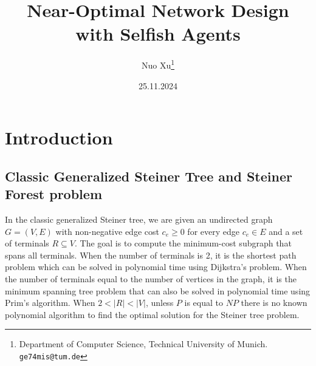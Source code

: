 \documentclass[11pt,psfig,times]{article}
\begin{document}
\title{Near-Optimal Network Design with Selfish Agents}
\author{Nuo Xu\thanks {Department of Computer Science, Technical University of Munich. {\tt ge74mis@tum.de}}}
\date{25.11.2024}
\maketitle

\section{Introduction}

\subsection{Classic Generalized Steiner Tree and Steiner Forest problem}
In the classic generalized Steiner tree, we are given an undirected graph \(G = (V,E)\) with non-negative edge cost \(c_e \geq 0\) for every edge $c_e \in E$ and a set of terminals $R \subseteq V $. The goal is to compute the minimum-cost subgraph that spans all terminals. When the number of terminals is 2, it is the shortest path problem which can be solved in polynomial time using Dijkstra's problem. When the number of terminals equal to the number of vertices in the graph, it is the minimum spanning tree problem that can also be solved in polynomial time using Prim's algorithm. When $ 2 < |R| < |V|$, unless $P$ is equal to $NP$ there is no known polynomial algorithm to find the optimal solution for the Steiner tree problem.
\end{document}
